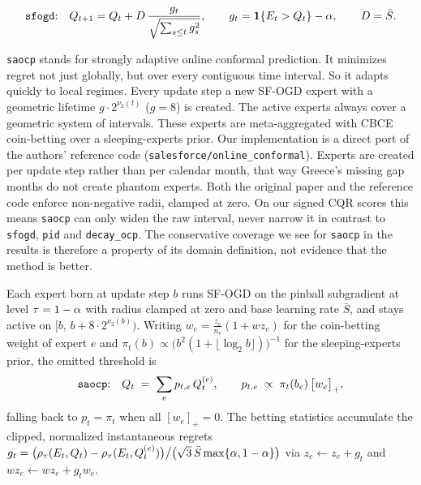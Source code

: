 \begin{equation}
  \text{\texttt{sfogd}:}\quad
  Q_{t+1} = Q_t + D\,\frac{g_t}{\sqrt{\sum_{s \le t} g_s^2}},
  \qquad
  g_t = \mathbf{1}\{E_t > Q_t\} - \alpha,
  \qquad D = \bar S .
  \label{eq:m-sfogd}
\end{equation}

\texttt{saocp} \parencite{bhatnagar2023sfogd} stands for strongly adaptive online
conformal prediction. It minimizes regret not just globally, but over every
contiguous time interval. So it adapts quickly to local regimes. Every update
step a new SF-OGD expert with a geometric lifetime $g \cdot
2^{\nu_2(t)}$ ($g=8$) is created. The active experts always cover a geometric system of intervals. These experts are meta-aggregated with CBCE coin-betting
\parencite{jun2017cbce} over a sleeping-experts prior. Our implementation is a
direct port of the authors' reference code (\texttt{salesforce/online\_conformal}). Experts are created per update step rather than per calendar month, that way Greece's missing gap months do not create phantom experts. Both the original paper and the reference code enforce non-negative radii, clamped at zero. On our signed CQR scores this means \texttt{saocp} can only widen the
raw interval, never narrow it in contrast to \texttt{sfogd}, \texttt{pid} and
\texttt{decay\_ocp}. The conservative coverage we see for \texttt{saocp} in
the results is therefore a property of its domain definition, not evidence
that the method is better.

Each expert born at update step $b$ runs SF-OGD on the pinball subgradient at
level $\tau = 1 - \alpha$ with radius clamped at zero and base learning rate
$\bar S$, and stays active on $[b,\, b + 8 \cdot 2^{\nu_2(b)})$. Writing
$w_e = \tfrac{z_e}{n_e}(1 + \mathit{wz}_e)$ for the coin-betting weight of
expert $e$ and $\pi_t(b) \propto \big(b^2 (1 + \lfloor \log_2 b \rfloor)\big)^{-1}$
for the sleeping-experts prior, the emitted threshold is
\begin{equation}
  \text{\texttt{saocp}:}\quad
  Q_t \;=\; \sum_{e} p_{t,e}\, Q_t^{(e)},
  \qquad
  p_{t,e} \;\propto\; \pi_t(b_e)\,\big[w_e\big]_+ ,
  \label{eq:m-saocp}
\end{equation}
falling back to $p_t = \pi_t$ when all $[w_e]_+ = 0$. The betting statistics
accumulate the clipped, normalized instantaneous regrets
$g_t = \big(\rho_\tau(E_t, Q_t) - \rho_\tau(E_t, Q_t^{(e)})\big)
        \big/ \big(\sqrt{3}\,\bar S \max\{\alpha, 1-\alpha\}\big)$
via $z_e \leftarrow z_e + g_t$ and $\mathit{wz}_e \leftarrow \mathit{wz}_e + g_t w_e$.

